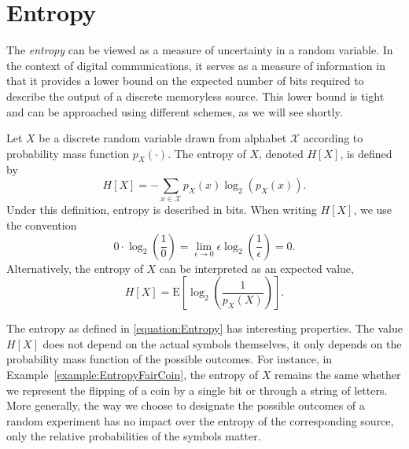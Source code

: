 \section{Entropy}

The \emph{entropy} can be viewed as a measure of uncertainty in a random variable.
In the context of digital communications, it serves as a measure of information in that it provides a lower bound on the expected number of bits required to describe the output of a discrete memoryless source.
This lower bound is tight and can be approached using different schemes, as we will see shortly.

\begin{definition}[Entropy]
Let $X$ be a discrete random variable drawn from alphabet $\mathcal{X}$ according to probability mass function $p_X(\cdot)$.
The entropy of $X$, denoted $H[X]$, is defined by
\begin{equation} \label{equation:Entropy}
H[X] = - \sum_{x \in \mathcal{X}} p_X (x) \log_2 ( p_X(x) ) .
\end{equation}
Under this definition, entropy is described in bits.
When writing $H[X]$, we use the convention
\begin{equation*}
0 \cdot \log_2 \left( \frac{1}{0} \right)
= \lim_{\epsilon \rightarrow 0} \epsilon \log_2 \left( \frac{1}{\epsilon} \right)
= 0 .
\end{equation*}
Alternatively, the entropy of $X$ can be interpreted as an expected value,
\begin{equation*}
H[X] = \mathrm{E} \left[ \log_2 \left( \frac{1}{p_X(X)} \right) \right] .
\end{equation*}
\end{definition}

The entropy as defined in \eqref{equation:Entropy} has interesting properties.
The value $H[X]$ does not depend on the actual symbols themselves, it only depends on the probability mass function of the possible outcomes.
For instance, in Example~\ref{example:EntropyFairCoin}, the entropy of $X$ remains the same whether we represent the flipping of a coin by a single bit or through a string of letters.
More generally, the way we choose to designate the possible outcomes of a random experiment has no impact over the entropy of the corresponding source, only the relative probabilities of the symbols matter.

